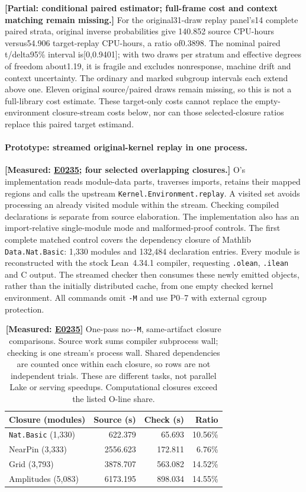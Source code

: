 \documentclass[10pt,twocolumn]{article}
\newcommand{\measured}[1]{\textbf{[Measured: #1]}}
\newcommand{\partialev}[1]{\textbf{[Partial: #1]}}
\newcommand{\expref}[2]{\href{https://github.com/yunwei37/proofserve/blob/main/docs/tmp/build-and-evaluate/step-#1/step-report.md}{E#2}}
\begin{document}
\partialev{conditional paired estimator; full-frame cost and context matching remain missing.}
For the original31-draw replay panel's14 complete paired strata, original inverse probabilities give
140.852 source CPU-hours versus54.906 target-replay CPU-hours,
a ratio of0.3898. The nominal paired t/delta95\% interval is[0,0.9401];
with two draws per stratum and effective degrees of freedom about1.19,
it is fragile and excludes nonresponse, machine drift and context uncertainty.
The ordinary and marked subgroup intervals each extend above one.
Eleven original source/paired draws remain missing, so this is not a
full-library cost estimate. These target-only costs cannot replace the
empty-environment closure-stream costs below, nor can those selected-closure
ratios replace this paired target estimand.

\paragraph{Prototype: streamed original-kernel replay in one process.}
\measured{\expref{0235-20261101T041713+0000}{0235}; four selected overlapping closures.}
O's implementation reads module-data parts, traverses imports, retains their
mapped regions and calls the upstream \texttt{Kernel.Environment.replay}.
A visited set avoids processing an already visited module within the stream.
Checking compiled declarations is separate from source elaboration.
The implementation also has an import-relative single-module mode and
malformed-proof controls.
The first complete matched control covers the dependency closure of
Mathlib \texttt{Data.Nat.Basic}: 1,330 modules and 132,484 declaration entries.
Every module is reconstructed with the stock Lean~4.34.1 compiler, requesting
\texttt{.olean}, \texttt{.ilean} and C output.
The streamed checker then consumes these newly emitted objects, rather than
the initially distributed cache, from one empty checked kernel environment.
All commands omit \texttt{-M} and use P0--7 with external cgroup protection.

\begin{table}[t]
\centering\small
\setlength{\tabcolsep}{3pt}
\begin{tabular}{lrrr}
\toprule
Closure (modules) & Source (s) & Check (s) & Ratio\\
\midrule
\texttt{Nat.Basic} (1,330) &622.379&65.693&10.56\%\\
NearPin (3,333) &2556.623&172.811&6.76\%\\
Grid (3,793) &3878.707&563.082&14.52\%\\
Amplitudes (5,083) &6173.195&898.034&14.55\%\\
\bottomrule
\end{tabular}
\caption{\measured{\expref{0235-20261101T041713+0000}{0235}} One-pass no-\texttt{-M}, same-artifact closure comparisons.
Source work sums compiler subprocess wall; checking is one stream's process
wall. Shared dependencies are counted once within each closure, so rows are
not independent trials. These are different tasks, not parallel Lake or
serving speedups. Computational closures exceed the listed O-line share.}
\label{tab:stream}
\end{table}
\end{document}
